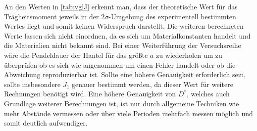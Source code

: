 An den Werten in \cref{tab:vglJ} erkennt man, dass der theoretische Wert für das Trägheitsmoment jeweils in der $2 \sigma$-Umgebung des experimentell bestimmten Wertes liegt und somit keinen Widerspruch darstellt. Die weiteren berechneten Werte lassen sich nicht einordnen, da es sich um Materialkonstanten handelt und die Materialien nicht bekannt sind. Bei einer Weiterführung der Versuchsreihe wäre die Pendeldauer der Hantel für das größte $a$ zu wiederholen um zu überprüfen ob es sich wie angenommen um einen Fehler handelt oder ob die Abweichung reproduzierbar ist. Sollte eine höhere Genauigkeit erforderlich sein, sollte insbesondere $J_1$ genauer bestimmt werden, da dieser Wert für weitere Rechnungen benötigt wird. Eine höhere Genauigkeit von $D^*$, welches auch Grundlage weiterer Berechnungen ist, ist nur durch allgemeine Techniken wie mehr Abstände vermessen oder über viele Perioden mehrfach messen möglich und somit deutlich aufwendiger. 













